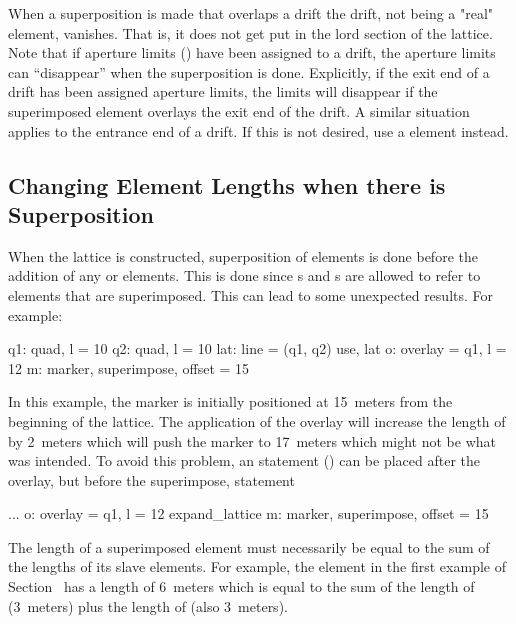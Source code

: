 When a superposition is made that overlaps a drift the drift, not
being a "real" element, vanishes. That is, it does not get put in the
lord section of the lattice.  Note that if aperture limits
() have been assigned to a drift, the aperture limits
can ``disappear'' when the superposition is done. Explicitly, if the
exit end of a drift has been assigned aperture limits, the limits will
disappear if the superimposed element overlays the exit end of the
drift. A similar situation applies to the entrance end of a drift. If
this is not desired, use a  element instead.

\subsection{Changing Element Lengths when there is Superposition}
\label{s:super.length}

When the lattice is constructed, superposition of elements is done
before the addition of any  or  elements. This
is done since s and s are allowed to refer
to elements that are superimposed. This can lead to some unexpected
results. For example:
\begin{example}
  q1: quad, l = 10
  q2: quad, l = 10
  lat: line = (q1, q2)
  use, lat
  o: overlay = {q1}, l = 12
  m: marker, superimpose, offset = 15
\end{example} 
In this example, the marker is initially positioned at 15~meters from
the beginning of the lattice.  The application of the overlay will
increase the length of  by 2~meters which will push the marker
 to 17~meters which might not be what was intended. To avoid
this problem, an  statement () can
be placed after the overlay, but before the superimpose, statement
\begin{example}
  ...
  o: overlay = {q1}, l = 12
  expand_lattice
  m: marker, superimpose, offset = 15
\end{example} 

The length of a superimposed element must necessarily be equal to the
sum of the lengths of its slave elements. For example, the element
 in the first example of Section~ has a length of
6~meters which is equal to the sum of the length of 
(3~meters) plus the length of  (also 3~meters).

